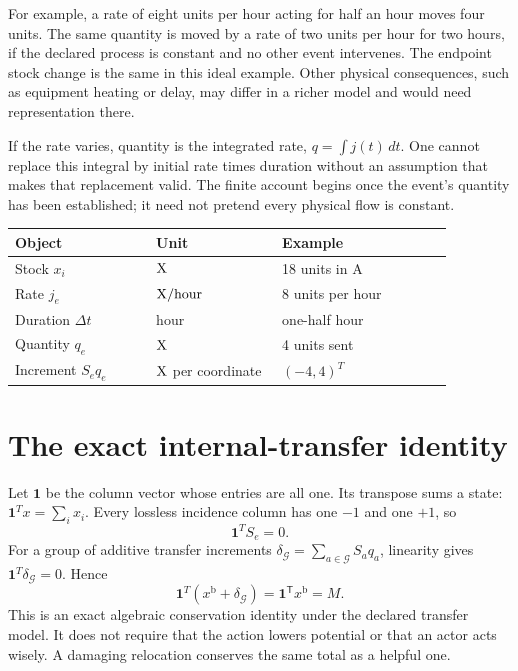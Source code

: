 For example, a rate of eight units per hour acting for half an hour moves four units. The same quantity is moved by a rate of two units per hour for two hours, if the declared process is constant and no other event intervenes. The endpoint stock change is the same in this ideal example. Other physical consequences, such as equipment heating or delay, may differ in a richer model and would need representation there.

If the rate varies, quantity is the integrated rate, \(q=\int j(t)\,dt\). One cannot replace this integral by initial rate times duration without an assumption that makes that replacement valid. The finite account begins once the event's quantity has been established; it need not pretend every physical flow is constant.

\begin{center}
\begin{tabular}{P{0.28\linewidth}P{0.25\linewidth}P{0.34\linewidth}}
\toprule
Object & Unit & Example\\
\midrule
Stock \(x_i\) & \(\mathrm{X}\) & 18 units in A\\
Rate \(j_e\) & \(\mathrm{X}/\mathrm{hour}\) & 8 units per hour\\
Duration \(\Delta t\) & hour & one-half hour\\
Quantity \(q_e\) & \(\mathrm{X}\) & 4 units sent\\
Increment \(S_e q_e\) & \(\mathrm{X}\) per coordinate & \((-4,4)^T\)\\
\bottomrule
\end{tabular}
\end{center}

\section{The exact internal-transfer identity}
Let \(\mathbf{1}\) be the column vector whose entries are all one. Its transpose sums a state: \(\mathbf{1}^Tx=\sum_i x_i\). Every lossless incidence column has one \(-1\) and one \(+1\), so
\begin{equation}
 \mathbf{1}^TS_e=0.
\end{equation}
For a group of additive transfer increments \(\delta_{\mathcal G}=\sum_{a\in {\mathcal G}}S_aq_a\), linearity gives \(\mathbf{1}^T\delta_{\mathcal G}=0\). Hence
\begin{equation}
 \mathbf{1}^T(x^{\mathrm{b}}+\delta_{\mathcal G})=\mathbf{1}^{\mathsf T}x^{\mathrm{b}}=M.
\end{equation}
This is an exact algebraic conservation identity under the declared transfer model. It does not require that the action lowers potential or that an actor acts wisely. A damaging relocation conserves the same total as a helpful one.

